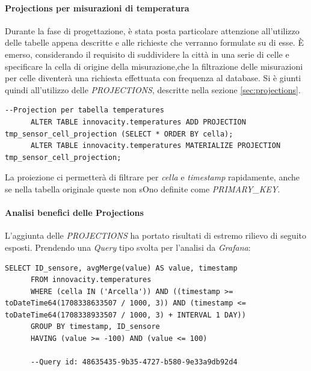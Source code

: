    
    
    \paragraph{Projections per misurazioni di temperatura} \label{sec:temp_projections}
    Durante la fase di progettazione, è stata posta particolare attenzione all'utilizzo delle tabelle appena descritte e alle richieste che verranno formulate su di esse. È emerso, considerando il requisito di suddividere la città in una serie di celle e specificare la cella di origine della misurazione,che la filtrazione delle misurazioni per celle diventerà una richiesta effettuata con frequenza al database.
    Si è giunti quindi all'utilizzo delle \textit{PROJECTIONS}, descritte nella sezione \ref{sec:projections}.
    \vspace{0,3cm}
    \begin{lstlisting}[caption={Esempio di proiezione e materializzazione in una tabella}, captionpos=b]
      --Projection per tabella temperatures
      ALTER TABLE innovacity.temperatures ADD PROJECTION tmp_sensor_cell_projection (SELECT * ORDER BY cella);
      ALTER TABLE innovacity.temperatures MATERIALIZE PROJECTION tmp_sensor_cell_projection;
  \end{lstlisting}
    \vspace{0,3cm}
    La proiezione ci permetterà di filtrare per \textit{cella} e \textit{timestamp} rapidamente, anche se nella tabella originale queste non sOno definite come \textit{PRIMARY\_KEY}.


    \paragraph{Analisi benefici delle Projections}\label{sec:temp_projections_benefici}
    L'aggiunta delle \textit{PROJECTIONS} ha portato risultati di estremo rilievo di seguito esposti.
    Prendendo una \textit{Query} tipo svolta per l'analisi da \textit{Grafana}:
    
    \begin{lstlisting}[caption={Query tipica - Grafana}, captionpos=b]
      SELECT ID_sensore, avgMerge(value) AS value, timestamp
      FROM innovacity.temperatures
      WHERE (cella IN ('Arcella')) AND ((timestamp >= toDateTime64(1708338633507 / 1000, 3)) AND (timestamp <= toDateTime64(1708338933507 / 1000, 3) + INTERVAL 1 DAY))
      GROUP BY timestamp, ID_sensore
      HAVING (value >= -100) AND (value <= 100)

      --Query id: 48635435-9b35-4727-b580-9e33a9db92d4
    \end{lstlisting}

